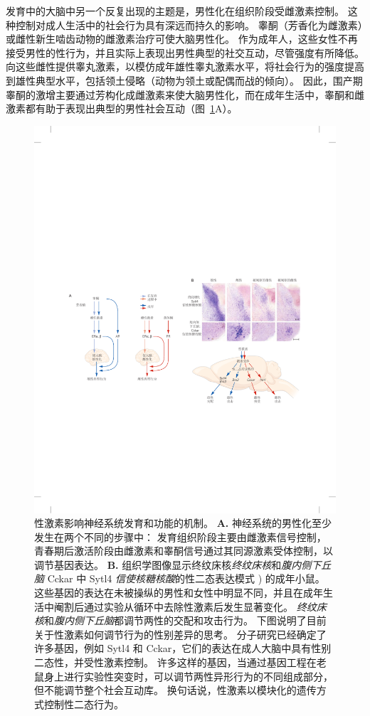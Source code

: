 发育中的大脑中另一个反复出现的主题是，男性化在组织阶段受雌激素控制。
这种控制对成人生活中的社会行为具有深远而持久的影响。
睾酮（芳香化为雌激素）或雌性新生啮齿动物的雌激素治疗可使大脑男性化。
作为成年人，这些女性不再接受男性的性行为，并且实际上表现出男性典型的社交互动，尽管强度有所降低。
向这些雌性提供睾丸激素，以模仿成年雄性睾丸激素水平，将社会行为的强度提高到雄性典型水平，包括领土侵略（动物为领土或配偶而战的倾向）。
因此，围产期睾酮的激增主要通过芳构化成雌激素来使大脑男性化，而在成年生活中，睾酮和雌激素都有助于表现出典型的男性社会互动（图~\ref{fig:51_12}A）。


\begin{figure}[htbp]
	\centering
	\includegraphics[width=1.0\linewidth]{chap51/fig_51_12}
	\caption{性激素影响神经系统发育和功能的机制。
		\textbf{A.} 神经系统的男性化至少发生在两个不同的步骤中：
		发育组织阶段主要由雌激素信号控制，青春期后激活阶段由雌激素和睾酮信号通过其同源激素受体控制，以调节基因表达。
		\textbf{B.} 组织学图像显示终纹床核\textit{终纹床核}和\textit{腹内侧下丘脑} Cckar 中 Sytl4 \textit{信使核糖核酸}的性二态表达模式 ) 的成年小鼠。
		这些基因的表达在未被操纵的男性和女性中明显不同，并且在成年生活中阉割后通过实验从循环中去除性激素后发生显著变化。
		\textit{终纹床核}和\textit{腹内侧下丘脑}都调节两性的交配和攻击行为。
		下图说明了目前关于性激素如何调节行为的性别差异的思考。
		分子研究已经确定了许多基因，例如 Sytl4 和 Cckar，它们的表达在成人大脑中具有性别二态性，并受性激素控制。
		许多这样的基因，当通过基因工程在老鼠身上进行实验性突变时，可以调节两性异形行为的不同组成部分，但不能调节整个社会互动库。
		换句话说，性激素以模块化的遗传方式控制性二态行为\cite{xu2012modular}。}
	\label{fig:51_12}
\end{figure}


